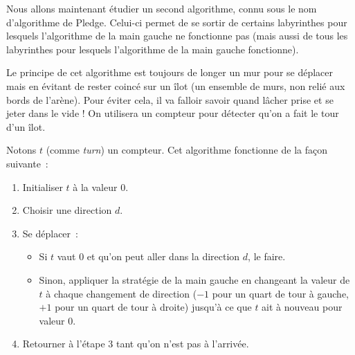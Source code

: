 \documentclass[a4paper]{article}
\begin{document}
Nous allons maintenant étudier un second algorithme, connu sous le nom d’algorithme de Pledge.
Celui-ci permet de se sortir de certains labyrinthes pour lesquels l'algorithme de la main gauche ne fonctionne pas (mais aussi de tous les labyrinthes pour lesquels l'algorithme de la main gauche fonctionne).

Le principe de cet algorithme est toujours de longer un mur pour se déplacer mais en évitant de rester coincé sur un îlot (un ensemble de murs, non relié aux bords de l'arène).
Pour éviter cela, il va falloir savoir quand lâcher prise et se jeter dans le vide !
On utilisera un compteur pour détecter qu'on a fait le tour d'un îlot.

Notons $t$ (comme \emph{turn}) un compteur. Cet algorithme fonctionne de la façon suivante~:
\begin{enumerate}
\item Initialiser $t$ à la valeur $0$.
\item Choisir une direction $d$.
\item Se déplacer~:
  \begin{itemize}
  \item Si $t$ vaut $0$ et qu'on peut aller dans la direction $d$, le faire.
  \item Sinon, appliquer la stratégie de la main gauche en changeant la valeur de $t$ à chaque changement de direction ($-1$ pour un quart de tour à gauche, $+1$ pour un quart de tour à droite) jusqu'à ce que $t$ ait à nouveau pour valeur $0$.
  \end{itemize}
\item Retourner à l'étape 3 tant qu'on n'est pas à l'arrivée.
\end{enumerate}


\end{document}
